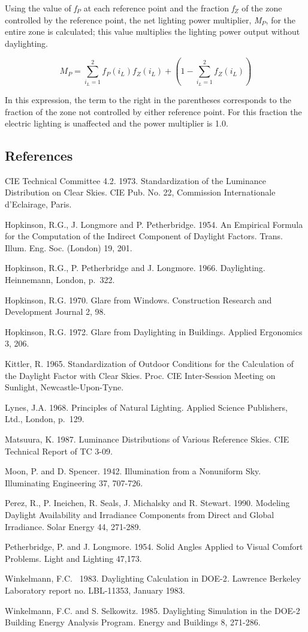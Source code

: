 Using the value of \emph{f\(_{P}\)} at each reference point and the fraction \emph{f\(_{Z}\)} of the zone controlled by the reference point, the net lighting power multiplier, \emph{M\(_{P}\)}, for the entire zone is calculated; this value multiplies the lighting power output without daylighting.

\begin{equation}
{M_P} = \sum\limits_{{i_L} = 1}^2 {{f_P}({i_L})} {f_Z}({i_L}) + \left( {1 - \sum\limits_{{i_L} = 1}^2 {} {f_Z}({i_L})} \right)
\end{equation}

In this expression, the term to the right in the parentheses corresponds to the fraction of the zone not controlled by either reference point. For this fraction the electric lighting is unaffected and the power multiplier is 1.0.

\subsection{References}\label{references-045}

CIE Technical Committee 4.2. 1973. Standardization of the Luminance Distribution on Clear Skies. CIE Pub. No. 22, Commission Internationale d'Eclairage, Paris.

Hopkinson, R.G., J. Longmore and P. Petherbridge. 1954. An Empirical Formula for the Computation of the Indirect Component of Daylight Factors. Trans. Illum. Eng. Soc. (London) 19, 201.

Hopkinson, R.G., P. Petherbridge and J. Longmore. 1966. Daylighting. Heinnemann, London, p.~322.

Hopkinson, R.G. 1970. Glare from Windows. Construction Research and Development Journal 2, 98.

Hopkinson, R.G. 1972. Glare from Daylighting in Buildings. Applied Ergonomics 3, 206.

Kittler, R. 1965. Standardization of Outdoor Conditions for the Calculation of the Daylight Factor with Clear Skies. Proc. CIE Inter-Session Meeting on Sunlight, Newcastle-Upon-Tyne.

Lynes, J.A. 1968. Principles of Natural Lighting. Applied Science Publishers, Ltd., London, p.~129.

Matsuura, K. 1987. Luminance Distributions of Various Reference Skies. CIE Technical Report of TC 3-09.

Moon, P. and D. Spencer. 1942. Illumination from a Nonuniform Sky. Illuminating Engineering 37, 707-726.

Perez, R., P. Ineichen, R. Seals, J. Michalsky and R. Stewart. 1990. Modeling Daylight Availability and Irradiance Components from Direct and Global Irradiance. Solar Energy 44, 271-289.

Petherbridge, P. and J. Longmore. 1954. Solid Angles Applied to Visual Comfort Problems. Light and Lighting 47,173.

Winkelmann, F.C.~ 1983. Daylighting Calculation in DOE-2\emph{.} Lawrence Berkeley Laboratory report no. LBL-11353, January 1983.

Winkelmann, F.C. and S. Selkowitz. 1985. Daylighting Simulation in the DOE-2 Building Energy Analysis Program\emph{.} Energy and Buildings 8, 271-286.
